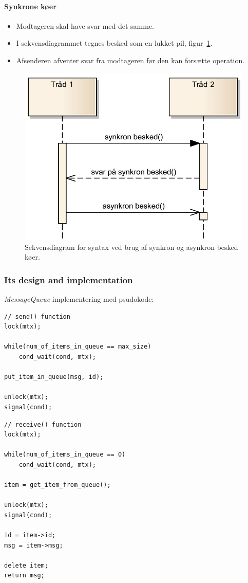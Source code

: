 \paragraph{Synkrone køer}
\begin{itemize}
	\item Modtageren skal have svar med det samme.
	\item I sekvensdiagrammet tegnes besked som en lukket pil, figur~\ref{fig:msq_seqdia}.
	\item Afsenderen afventer svar fra modtageren før den kan forsætte operation.
\end{itemize}

\begin{figure}[h]
	\centering
	\includegraphics[width=0.6\linewidth]{figs/spm3/msq_seqdia}
	\caption[Syntax for sekvensdiagram med syn -og asynkron msq.]{Sekvensdiagram for syntax ved brug af synkron og asynkron besked køer.}
	\label{fig:msq_seqdia}
\end{figure}

\subsubsection{Its design and implementation}
\textit{MessageQueue} implementering med psudokode:

\begin{lstlisting}[otherkeywords={unlock, lock, signal, cond_wait}]
// send() function
lock(mtx);

while(num_of_items_in_queue == max_size)
	cond_wait(cond, mtx);

put_item_in_queue(msg, id);

unlock(mtx);
signal(cond);
\end{lstlisting}

\begin{lstlisting}
// receive() function
lock(mtx);

while(num_of_items_in_queue == 0)
	cond_wait(cond, mtx);

item = get_item_from_queue();

unlock(mtx);
signal(cond);

id = item->id;
msg = item->msg;

delete item;
return msg;
\end{lstlisting}

